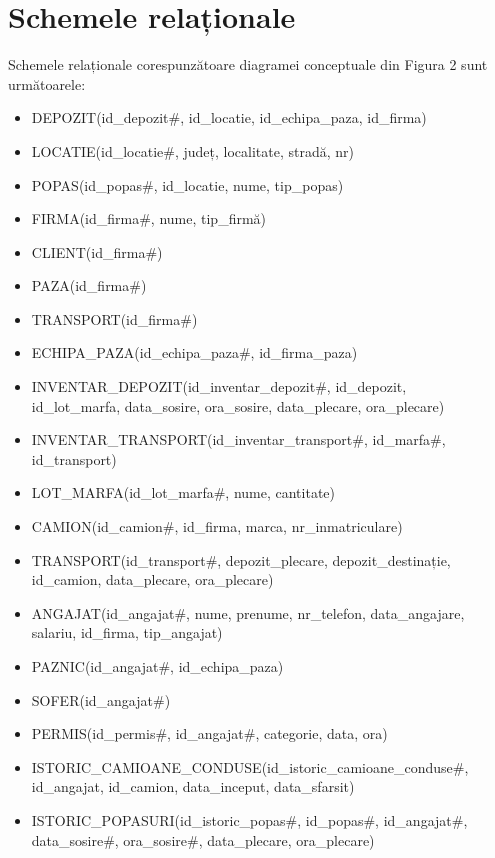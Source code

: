 \documentclass[12pt, a4paper]{article}
\begin{document}
\section{Schemele relaționale}
\quad \par
Schemele relaționale corespunzătoare diagramei conceptuale din Figura 2 sunt următoarele:
\begin{itemize}
    \item DEPOZIT(id\_depozit\#, id\_locatie, id\_echipa\_paza, id\_firma)
    \item LOCATIE(id\_locatie\#, județ, localitate, stradă, nr)
    \item POPAS(id\_popas\#, id\_locatie, nume, tip\_popas)
    \item FIRMA(id\_firma\#, nume, tip\_firmă)
    \item CLIENT(id\_firma\#)
    \item PAZA(id\_firma\#)
    \item TRANSPORT(id\_firma\#)
    \item ECHIPA\_PAZA(id\_echipa\_paza\#, id\_firma\_paza)
    \item INVENTAR\_DEPOZIT(id\_inventar\_depozit\#, id\_depozit, \\id\_lot\_marfa, data\_sosire, ora\_sosire, data\_plecare, ora\_plecare)
    \item INVENTAR\_TRANSPORT(id\_inventar\_transport\#, id\_marfa\#,\\ id\_transport)
    \item LOT\_MARFA(id\_lot\_marfa\#, nume, cantitate)
    \item CAMION(id\_camion\#, id\_firma, marca, nr\_inmatriculare)
    \item TRANSPORT(id\_transport\#, depozit\_plecare, depozit\_destinație,\\ id\_camion, data\_plecare, ora\_plecare)
    \item ANGAJAT(id\_angajat\#, nume, prenume, nr\_telefon, data\_angajare, salariu, id\_firma, tip\_angajat)
    \item PAZNIC(id\_angajat\#, id\_echipa\_paza)
    \item SOFER(id\_angajat\#)
    \item PERMIS(id\_permis\#, id\_angajat\#, categorie, data, ora)
    \item ISTORIC\_CAMIOANE\_CONDUSE(id\_istoric\_camioane\_conduse\#,\\ id\_angajat, id\_camion, data\_inceput, data\_sfarsit)
    \item ISTORIC\_POPASURI(id\_istoric\_popas\#, id\_popas\#, id\_angajat\#,\\ data\_sosire\#, ora\_sosire\#, data\_plecare, ora\_plecare)
\end{itemize}
\end{document}
